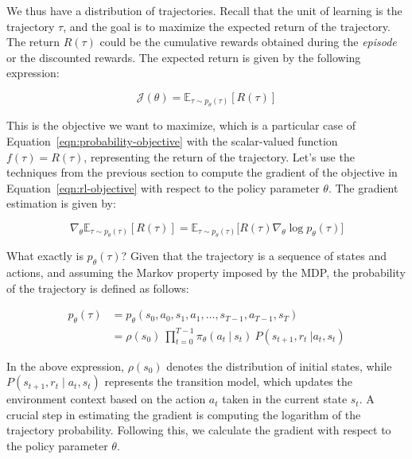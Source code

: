 \noindent We thus have a distribution of trajectories. Recall that the unit of learning is the trajectory $\tau$, and the goal is to maximize the expected return of the trajectory. The return $R(\tau)$ could be the cumulative rewards obtained during the \textit{episode} or the discounted rewards. The expected return is given by the following expression:

\begin{equation}\label{eqn:rl-objective}
    \mathcal{J}(\theta)=\mathbb{E}_{\tau\sim p_{\theta}(\tau)}[R(\tau)] 
\end{equation}

\noindent This is the objective we want to maximize, which is a 
particular case of Equation~\ref{eqn:probability-objective} with the
scalar-valued function $f(\tau) = R(\tau)$, representing the return of the trajectory. Let's use the techniques from the previous section to compute the
gradient of the objective in Equation~\ref{eqn:rl-objective} with respect to the policy parameter $\theta$. The gradient estimation is given by:

\begin{equation}\label{eqn:rl-gradient-estimator-vanilla}
    \nabla_{\theta} \mathbb{E}_{\tau\sim p_{\theta}(\tau)}[R(\tau)] = \mathbb{E}_{\tau\sim p_{\theta}(\tau)}\big[R(\tau)\nabla_{\theta}\log p_{\theta}(\tau)\big]
\end{equation}    


\noindent What exactly is $p_{\theta}(\tau)$? Given that the trajectory is a sequence of states and actions, and assuming the Markov property imposed by the MDP, the probability of the trajectory is defined as follows:

\begin{equation}\label{eqn:trajectory-probability-expanded}
    \begin{split}
        p_{\theta}(\tau) &= p_\theta(s_{0}, a_{0}, s_{1}, a_{1}, \dots, s_{T-1}, a_{T-1}, s_{T}) \\
        &= \rho(s_0)~\prod_{t=0}^{T-1} \pi_{\theta}(a_{t}~|~s_{t})~P(s_{t+1}, r_{t}~|a_{t}, s_{t})
    \end{split}
\end{equation}

\noindent In the above expression, $\rho(s_{0})$ denotes the distribution of initial states, while $P(s_{t+1}, r_{t}\mid a_{t}, s_{t})$ represents the transition model, which updates the environment context based on the action $a_{t}$ taken in the current state $s_{t}$. A crucial step in estimating the gradient is computing the logarithm of the trajectory probability. Following this, we calculate the gradient with respect to the policy parameter $\theta$. 

